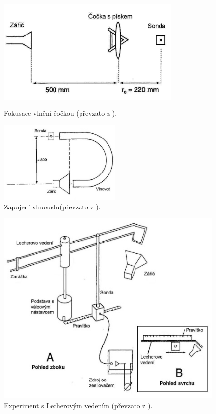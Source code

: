 \documentclass[english]{article}
\begin{document}
	\begin{figure}[h!]
	\centering
	\begin{minipage}{.55\textwidth}
	  \centering
			\includegraphics[width=9cm]{att/fokusace_cockou.jpg}
			\caption{Fokusace vlnění čočkou (převzato z  \cite{bib:zadani}). }
			\label{fig:fokusace_cockou}
	\end{minipage}
	\hfill
	\begin{minipage}{.35\textwidth}
	  \centering
			\includegraphics[width=6cm]{att/vlnovod.jpg}
			\caption{Zapojení vlnovodu\newline (převzato z  \cite{bib:zadani}). }
			\label{fig:vlnovod}
	\end{minipage}
	\end{figure}		

	\begin{figure}[h]
	\centering
			\includegraphics[width=13cm]{att/lecherovo_vedeni.jpg}
			\caption{Experiment s Lecherovým vedením (převzato z  \cite{bib:zadani}). }
			\label{fig:lecherovo_vlneni}
	\end{figure}	
	
\end{document}
